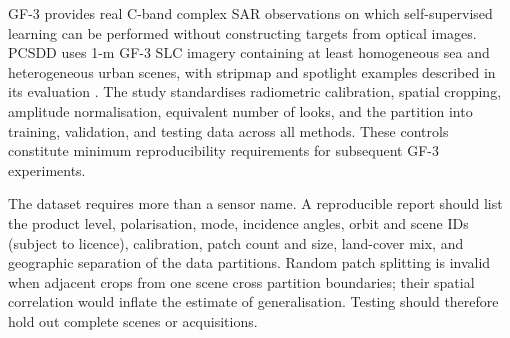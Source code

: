 \documentclass[11pt]{article}
\begin{document}
GF-3 provides real C-band complex SAR observations on which self-supervised learning can be performed without constructing targets from optical images. PCSDD uses 1-m GF-3 SLC imagery containing at least homogeneous sea and heterogeneous urban scenes, with stripmap and spotlight examples described in its evaluation \cite{Xiong2026PCSDD}. The study standardises radiometric calibration, spatial cropping, amplitude normalisation, equivalent number of looks, and the partition into training, validation, and testing data across all methods. These controls constitute minimum reproducibility requirements for subsequent GF-3 experiments.

The dataset requires more than a sensor name. A reproducible report should list the product level, polarisation, mode, incidence angles, orbit and scene IDs (subject to licence), calibration, patch count and size, land-cover mix, and geographic separation of the data partitions. Random patch splitting is invalid when adjacent crops from one scene cross partition boundaries; their spatial correlation would inflate the estimate of generalisation. Testing should therefore hold out complete scenes or acquisitions.
\end{document}
